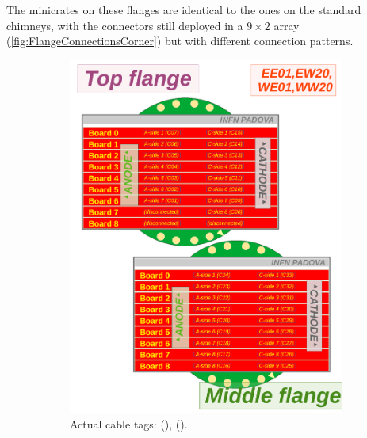 The minicrates on these flanges are identical to the ones on the standard chimneys,
with the connectors still deployed in a $9 \times 2$ array
(\cref{fig:FlangeConnectionsCorner})
but with different connection patterns.

\begin{figure}
  \begin{subfigure}{0.50\linewidth}
    \includegraphics[width=\textwidth]{figures/CornerFlangesAndMinicrate_upward}
    \caption{Actual cable tags:  (),  ().}
    \label{fig:FlangeConnectionsCorner_upward}
  \end{subfigure}
  \begin{subfigure}{0.50\linewidth}

\end{subfigure}
\end{figure}
